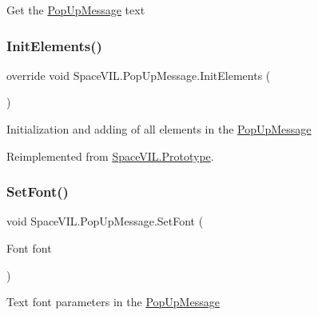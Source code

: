 Get the \mbox{\hyperlink{class_space_v_i_l_1_1_pop_up_message}{Pop\+Up\+Message}} text 

\mbox{\label{class_space_v_i_l_1_1_pop_up_message_a34573fddbd8492ec1261c65f59dd3bbb}} 
\subsubsection{\texorpdfstring{Init\+Elements()}{InitElements()}}
{\footnotesize\ttfamily override void Space\+V\+I\+L.\+Pop\+Up\+Message.\+Init\+Elements (\begin{DoxyParamCaption}{ }\end{DoxyParamCaption})\hspace{0.3cm}{\ttfamily [virtual]}}



Initialization and adding of all elements in the \mbox{\hyperlink{class_space_v_i_l_1_1_pop_up_message}{Pop\+Up\+Message}} 



Reimplemented from \mbox{\hyperlink{class_space_v_i_l_1_1_prototype_ac3379fe02923ee155b5b0084abf27420}{Space\+V\+I\+L.\+Prototype}}.

\mbox{\label{class_space_v_i_l_1_1_pop_up_message_a06b40259435cf6916dc11467eec83d01}} 
\subsubsection{\texorpdfstring{Set\+Font()}{SetFont()}}
{\footnotesize\ttfamily void Space\+V\+I\+L.\+Pop\+Up\+Message.\+Set\+Font (\begin{DoxyParamCaption}\item[{Font}]{font }\end{DoxyParamCaption})}



Text font parameters in the \mbox{\hyperlink{class_space_v_i_l_1_1_pop_up_message}{Pop\+Up\+Message}} 

